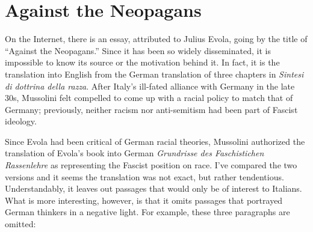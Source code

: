 \section{Against the Neopagans}

On the Internet, there is an essay, attributed to Julius Evola, going by the title of ``Against the Neopagans.'' Since it has been so widely disseminated, it is impossible to know its source or the motivation behind it. In fact, it is the translation into English from the German translation of three chapters in \emph{Sintesi di dottrina della razza}. After Italy's ill-fated alliance with Germany in the late 30s, Mussolini felt compelled to come up with a racial policy to match that of Germany; previously, neither racism nor anti-semitism had been part of Fascist ideology.

Since Evola had been critical of German racial theories, Mussolini authorized the translation of Evola's book into German \emph{Grundrisse des Faschistichen Rassenlehre} as representing the Fascist position on race. I've compared the two versions and it seems the translation was not exact, but rather tendentious. Understandably, it leaves out passages that would only be of interest to Italians. What is more interesting, however, is that it omits passages that portrayed German thinkers in a negative light. For example, these three paragraphs are omitted:

